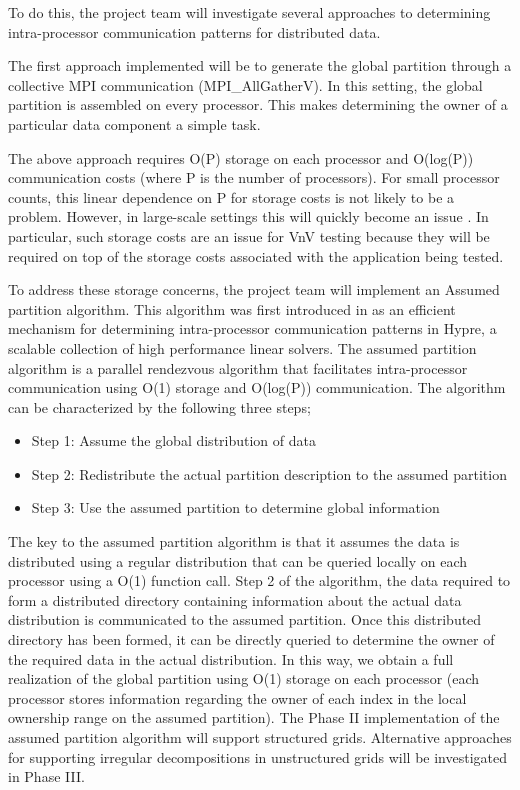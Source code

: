 To do this, the project team will investigate several approaches to determining intra-processor communication patterns for distributed data. 

The first approach implemented will be to generate the global partition through a collective MPI communication (MPI\_AllGatherV). In this setting, the global partition is assembled on every processor. This makes determining the owner of a particular data component a simple task. 

The above approach requires O(P) storage on each processor and O(log(P)) communication costs (where P is the number of processors). For small processor counts, this linear dependence on P for storage costs is not likely to be a problem. However, in large-scale settings this will quickly become an issue \cite{hypre-assumed}. In particular, such storage costs are an issue for VnV testing because they will be required on top of the storage costs associated with the application being tested. 

To address these storage concerns, the project team will implement an Assumed partition algorithm. This algorithm was first introduced in \cite{} as an efficient mechanism for determining intra-processor communication patterns in Hypre, a scalable collection of high performance linear solvers. The assumed partition algorithm is a parallel rendezvous algorithm that facilitates intra-processor communication using O(1) storage and O(log(P)) communication. The algorithm can be characterized by the following three steps;
\begin{itemize}
 \item Step 1: Assume the global distribution of data 
 \item Step 2: Redistribute the actual partition description to the assumed partition
 \item Step 3: Use the assumed partition to determine global information
\end{itemize}

The key to the assumed partition algorithm is that it assumes the data is distributed using a regular distribution that 
can be queried locally on each processor using a O(1) function call. Step 2 of the algorithm, the data required to form a distributed directory
containing information about the actual data distribution is communicated to the assumed partition. Once this distributed directory has 
been formed, it can be directly queried to determine the owner of the required data in the actual distribution. In this way, we obtain a full realization of the global partition using O(1) storage on each processor (each processor stores information regarding the owner of each index in the local ownership range on the assumed partition). The Phase II implementation of the assumed partition algorithm will support structured grids. Alternative approaches for supporting irregular decompositions in unstructured grids will be investigated in Phase III. 

